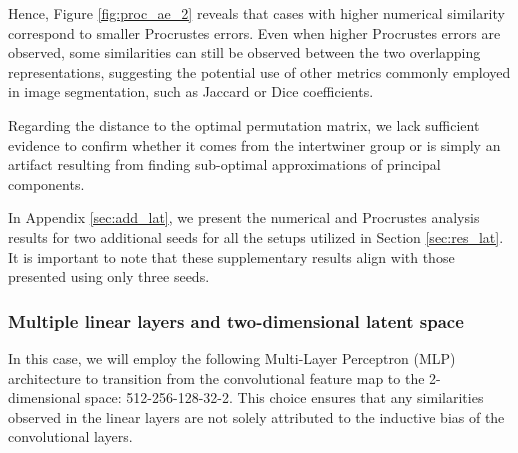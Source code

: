 \documentclass[../main.tex]{subfiles}
\begin{document}
Hence, Figure \ref{fig:proc_ae_2} reveals that cases with higher numerical similarity correspond to smaller Procrustes errors. Even when higher Procrustes errors are observed, some similarities can still be observed between the two overlapping representations, suggesting the potential use of other metrics commonly employed in image segmentation, such as Jaccard or Dice coefficients.

Regarding the distance to the optimal permutation matrix, we lack sufficient evidence to confirm whether it comes from the intertwiner group or is simply an artifact resulting from finding sub-optimal approximations of principal components.\\

\begin{mathNote}
In Appendix \ref{sec:add_lat}, we present the numerical and Procrustes analysis results for two additional seeds for all the setups utilized in Section \ref{sec:res_lat}. It is important to note that these supplementary results align with those presented using only three seeds.
\end{mathNote}

\subsubsection*{Multiple linear layers and two-dimensional latent space}

In this case, we will employ the following Multi-Layer Perceptron (MLP) architecture to transition from the convolutional feature map to the 2-dimensional space: 512-256-128-32-2. This choice ensures that any similarities observed in the linear layers are not solely attributed to the inductive bias of the convolutional layers.\\
\end{document}
